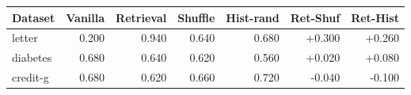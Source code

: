 \begin{tabular}{lrrrrrr}
\toprule
Dataset & Vanilla & Retrieval & Shuffle & Hist-rand & Ret-Shuf & Ret-Hist \\
\midrule
letter & 0.200 & 0.940 & 0.640 & 0.680 & +0.300 & +0.260 \\
diabetes & 0.680 & 0.640 & 0.620 & 0.560 & +0.020 & +0.080 \\
credit-g & 0.680 & 0.620 & 0.660 & 0.720 & -0.040 & -0.100 \\
\bottomrule
\end{tabular}
